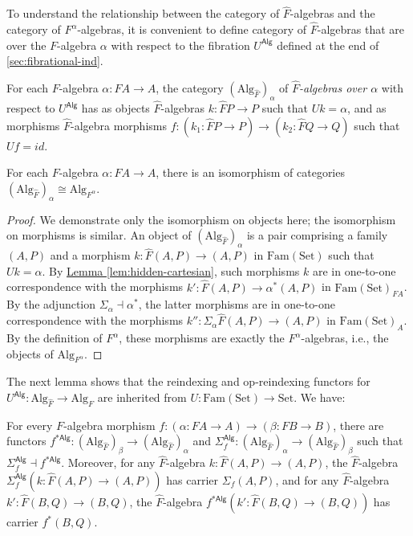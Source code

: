 \documentclass{LMCS}
\newcommand{\Fam}{\mathrm{Fam}}
\newcommand{\Set}{\mathrm{Set}}
\newcommand{\Alg}{\mathrm{Alg}}
\newcommand{\palg}{U^{\mathsf{Alg}}}
\newcommand{\reindAlg}{*{\mathsf{Alg}}}
\newcommand{\lemref}[1]{\hyperref[#1]{Lemma \ref*{#1}}}
\begin{document}
To understand the relationship between the category of
$\hat{F}$-algebras and the category of $F^\alpha$-algebras, it is
convenient to define category of $\hat{F}$-algebras that are over the
$F$-algebra $\alpha$ with respect to the fibration $\palg$ defined at
the end of \autoref{sec:fibrational-ind}.

\begin{defi}
  For each $F$-algebra $\alpha : FA \to A$, the category
  $(\Alg_{\hat{F}})_\alpha$ of {\em $\hat{F}$-algebras over $\alpha$}
  with respect to $\palg$ has as objects $\hat{F}$-algebras $k :
  \hat{F}P \to P$ such that $Uk = \alpha$, and as morphisms
  $\hat{F}$-algebra morphisms $f : (k_1 : \hat{F}P \to P) \to (k_2 :
  \hat{F}Q \to Q)$ such that $Uf = \mathit{id}$.
\end{defi}

\begin{lem}\label{lem:alg-iso}
  For each $F$-algebra $\alpha : FA \to A$, there is an isomorphism of
  categories $(\Alg_{\hat{F}})_\alpha \cong \Alg_{F^\alpha}$.
\end{lem}
\begin{proof}
  We demonstrate only the isomorphism on objects here; the isomorphism
  on morphisms is similar. An object of $(\Alg_{\hat{F}})_\alpha$ is a
  pair comprising a family $(A,P)$ and a morphism $k : \hat{F}(A,P)
  \to (A,P)$ in $\Fam(\Set)$ such that $Uk = \alpha$. By
  \lemref{lem:hidden-cartesian}, such morphisms $k$ are in one-to-one
  correspondence with the morphisms $k' : \hat{F}(A,P) \to
  \alpha^*(A,P)$ in $\Fam(\Set)_{FA}$. By the adjunction
  $\Sigma_\alpha \dashv \alpha^*$, the latter morphisms are in
  one-to-one correspondence with the morphisms $k'' : \Sigma_\alpha
  \hat{F}(A,P) \to (A,P)$ in $\Fam(\Set)_A$. By the definition of
  $F^\alpha$, these morphisms are exactly the $F^\alpha$-algebras,
  i.e., the objects of $\Alg_{F^\alpha}$.
\end{proof}

The next lemma shows that the reindexing and op-reindexing functors
for $\palg : \Alg_{\hat{F}} \to \Alg_F$ are inherited from $U :
\Fam(\Set) \to \Set$. We have:

\begin{lem}\label{lem:alg-bifibration}
  For every $F$-algebra morphism $f : (\alpha : FA \to A) \to (\beta :
  FB \to B)$, there are functors $f^{\reindAlg} :
  (\Alg_{\hat{F}})_\beta \to (\Alg_{\hat{F}})_\alpha$ and
  $\Sigma^{\mathsf{Alg}}_f : (\Alg_{\hat{F}})_\alpha \to
  (\Alg_{\hat{F}})_\beta$ such that $\Sigma^{\mathsf{Alg}}_f \dashv
  f^{\reindAlg}$. Moreover, for any $\hat{F}$-algebra $k :
  \hat{F}(A,P) \to (A,P)$, the $\hat{F}$-algebra
  $\Sigma^{\mathsf{Alg}}_f(k : \hat{F}(A,P) \to (A,P))$ has carrier
  $\Sigma_f(A,P)$, and for any $\hat{F}$-algebra $k' : \hat{F}(B,Q)
  \to (B,Q)$, the $\hat{F}$-algebra $f^{\reindAlg}(k' : \hat{F}(B,Q)
  \to (B,Q))$ has carrier $f^*(B,Q)$.
\end{lem}
\end{document}
